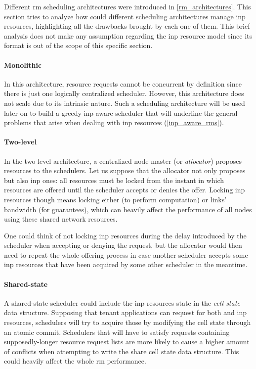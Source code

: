 Different \gls{rm} scheduling architectures were introduced in \autoref{rm_architectures}.
This section tries to analyze how could different scheduling architectures manage \gls{inp} resources, highlighting all the drawbacks brought by each one of them.
This brief analysis does not make any assumption regarding the \gls{inp} resource model since its format is out of the scope of this specific section.

\paragraph{Monolithic}
In this architecture, resource requests cannot be concurrent by definition since there is just one logically centralized scheduler.
However, this architecture does not scale due to its intrinsic nature.
Such a scheduling architecture will be used later on to build a greedy \gls{inp}-aware scheduler that will underline the general problems that arise when dealing with \gls{inp} resources (\autoref{inp_aware_rms}).

\paragraph{Two-level}
In the two-level architecture, a centralized node master (or \textit{allocator}) proposes resources to the schedulers.
Let us suppose that the allocator not only proposes  but also \gls{inp} ones: all resources must be locked from the instant in which resources are offered until the scheduler accepts or denies the offer.
Locking \gls{inp} resources though means locking either  (to perform computation) or links' bandwidth (for guarantees), which can heavily affect the performance of all nodes using these shared network resources.\par
One could think of not locking \gls{inp} resources during the delay introduced by the scheduler when accepting or denying the request, but the allocator would then need to repeat the whole offering process in case another scheduler accepts some \gls{inp} resources that have been acquired by some other scheduler in the meantime.

\paragraph{Shared-state}
A shared-state scheduler could include the \gls{inp} resources state in the \textit{cell state} data structure.
Supposing that tenant applications can request for both  and \gls{inp} resources, schedulers will try to acquire those by modifying the cell state through an atomic commit.
Schedulers that will have to satisfy requests containing supposedly-longer resource request lists are more likely to cause a higher amount of conflicts when attempting to write the share cell state data structure.
This could heavily affect the whole \gls{rm} performance.
